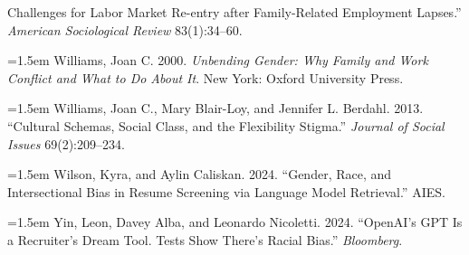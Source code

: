 \documentclass[11pt]{article}
\begin{document}
{Challenges for Labor Market Re-entry after Family-Related Employment
Lapses.'' \emph{American Sociological Review} 83(1):34--60.\par\smallskip
\noindent\hangindent=1.5em Williams, Joan C. 2000. \emph{Unbending Gender: Why Family and Work
Conflict and What to Do About It}. New York: Oxford University Press.\par\smallskip
\noindent\hangindent=1.5em Williams, Joan C., Mary Blair-Loy, and Jennifer L. Berdahl. 2013.
``Cultural Schemas, Social Class, and the Flexibility Stigma.''
\emph{Journal of Social Issues} 69(2):209--234.\par\smallskip
\noindent\hangindent=1.5em Wilson, Kyra, and Aylin Caliskan. 2024. ``Gender, Race, and
Intersectional Bias in Resume Screening via Language Model Retrieval.''
AIES.\par\smallskip
\noindent\hangindent=1.5em Yin, Leon, Davey Alba, and Leonardo Nicoletti. 2024. ``OpenAI's GPT Is a
Recruiter's Dream Tool. Tests Show There's Racial Bias.''
\emph{Bloomberg}.\par\smallskip}
\end{document}
